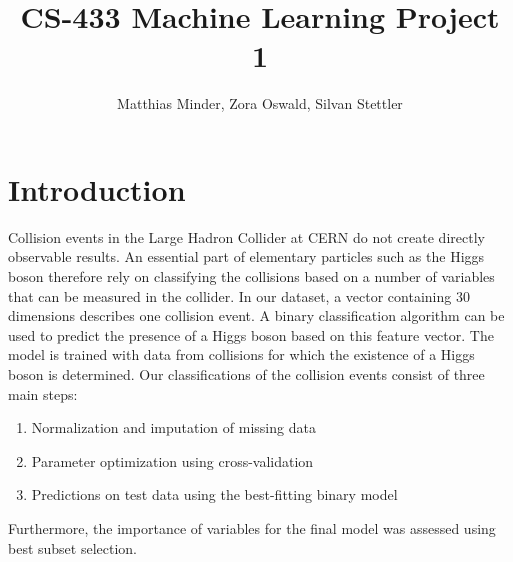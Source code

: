 \documentclass[10pt,conference,compsocconf]{IEEEtran}
\begin{document}
\title{CS-433 Machine Learning Project 1}

\author{
  Matthias Minder, Zora Oswald, Silvan Stettler\\
  
}

\maketitle

\begin{abstract}
\end{abstract}

\section*{Introduction}
Collision events in the Large Hadron Collider at CERN do not create directly observable results. An essential part of elementary particles such as the Higgs boson therefore rely on classifying the collisions based on a number of variables that can be measured in the collider. 
In our dataset, a vector containing 30 dimensions describes one collision event. A binary classification algorithm can be used to predict the presence of a Higgs boson based on this feature vector. The model is trained with data from collisions for which the existence of a Higgs boson is determined.
Our classifications of the collision events consist of three main steps:
\begin{enumerate}
\item Normalization and imputation of missing data 
\item Parameter optimization using cross-validation
\item Predictions on test data using the best-fitting binary model 
\end{enumerate}
Furthermore, the importance of variables for the final model was assessed using best subset selection.
\end{document}
